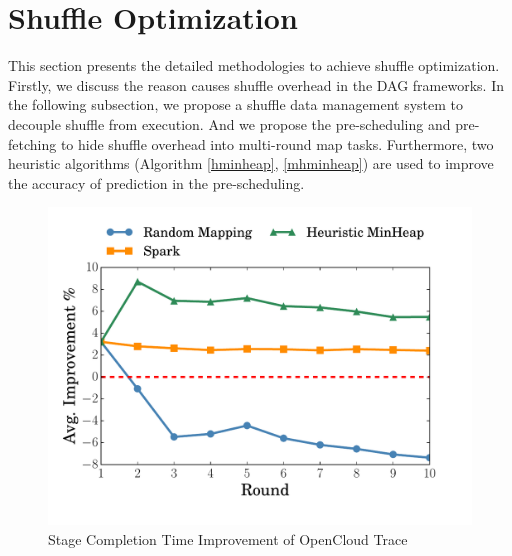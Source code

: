 \section{Shuffle Optimization}
\label{opt}
This section presents the detailed methodologies to achieve shuffle optimization. 
{\color{blue}
Firstly, we discuss the reason causes shuffle overhead in the DAG frameworks.
In the following subsection, we propose a shuffle data management system to decouple shuffle from execution. 
And we propose the pre-scheduling and pre-fetching to hide shuffle overhead into multi-round map tasks.
Furthermore, two heuristic algorithms (Algorithm \ref{hminheap}, \ref{mhminheap}) are used to improve the accuracy of prediction in the pre-scheduling.
}


\begin{figure}
	\centering
	\includegraphics[width=.6\linewidth]{fig/sim} %
	\caption{Stage Completion Time Improvement of OpenCloud Trace}
	\label{fig:sim}
\end{figure}

